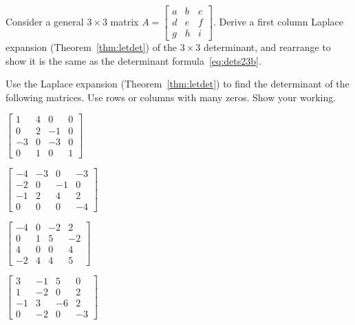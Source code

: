 \begin{exercise} \label{ex:} 
Consider a general \(3\times3\) matrix \(A=\begin{bmatrix} a&b&c \\d&e&f\\ g&h&i \end{bmatrix}\).
Derive a first column Laplace expansion (Theorem~\ref{thm:letdet}) of the \(3\times3\) determinant, and rearrange to show it is the same as the determinant formula~\eqref{eq:dets23b}.
\end{exercise}





\begin{exercise} \label{ex:} 
Use the Laplace expansion (Theorem~\ref{thm:letdet}) to find the determinant of the following matrices.  
Use rows or columns with many zeros.
Show your working.
\begin{parts}
\item \(\begin{bmatrix} 1 & 4 & 0 & 0
\\0 & 2 & -1 & 0
\\-3 & 0 & -3 & 0
\\0 & 1 & 0 & 1 \end{bmatrix}\)

\item \(\begin{bmatrix} -4 & -3 & 0 & -3
\\-2 & 0 & -1 & 0
\\-1 & 2 & 4 & 2
\\0 & 0 & 0 & -4 \end{bmatrix}\)

\item \(\begin{bmatrix} -4 & 0 & -2 & 2
\\0 & 1 & 5 & -2
\\4 & 0 & 0 & 4
\\-2 & 4 & 4 & 5 \end{bmatrix}\)

\item \(\begin{bmatrix} 3 & -1 & 5 & 0
\\1 & -2 & 0 & 2
\\-1 & 3 & -6 & 2
\\0 & -2 & 0 & -3 \end{bmatrix}\)


\end{parts}
\end{exercise}
